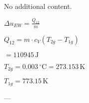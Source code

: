 No additional content.

\( \Delta u_{EW} = \frac{Q_{12}}{m} \)  

\( Q_{12} = m \cdot c_V (T_{2g} - T_{1g}) \)  

\( = 110945 \, \text{J} \)  

\( T_{2g} = 0.003 \, ^\circ \text{C} = 273.153 \, \text{K} \)  

\( T_{1g} = 773.15 \, \text{K} \)  

---